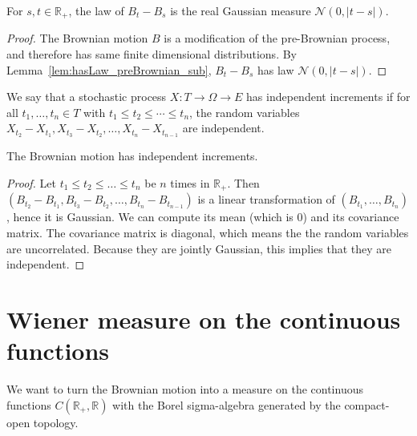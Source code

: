 \begin{lemma}\label{lem:hasLaw_brownian_sub}
  \leanok
For $s, t \in \mathbb{R}_+$, the law of $B_t - B_s$ is the real Gaussian measure $\mathcal{N}(0,\vert t - s \vert)$.
\end{lemma}

\begin{proof}\leanok
The Brownian motion $B$ is a modification of the pre-Brownian process, and therefore has same finite dimensional distributions. By Lemma~\ref{lem:hasLaw_preBrownian_sub}, $B_t - B_s$ has law $\mathcal{N}(0,\vert t - s \vert)$.
\end{proof}


\begin{definition}\label{def:HasIndepIncrements}
  \mathlibok
We say that a stochastic process $X : T \to \Omega \to E$ has independent increments if for all $t_1, \ldots, t_n \in T$ with $t_1 \le t_2 \le \cdots \le t_n$, the random variables $X_{t_2} - X_{t_1}, X_{t_3} - X_{t_2}, \ldots, X_{t_n} - X_{t_{n-1}}$ are independent.
\end{definition}


\begin{lemma}\label{lem:hasIndepIncrements_brownian}
  \leanok
The Brownian motion has independent increments.
\end{lemma}

\begin{proof}\leanok
Let $t_1 \le t_2 \le \ldots \le t_n$ be $n$ times in $\mathbb{R}_+$.
Then $(B_{t_2} - B_{t_1}, B_{t_3} - B_{t_2}, \ldots, B_{t_n} - B_{t_{n-1}})$ is a linear transformation of $(B_{t_1}, \ldots, B_{t_n})$, hence it is Gaussian.
We can compute its mean (which is $0$) and its covariance matrix.
The covariance matrix is diagonal, which means the the random variables are uncorrelated.
Because they are jointly Gaussian, this implies that they are independent.
\end{proof}


\section{Wiener measure on the continuous functions}

We want to turn the Brownian motion into a measure on the continuous functions $C(\mathbb{R}_+, \mathbb{R})$ with the Borel sigma-algebra generated by the compact-open topology.


